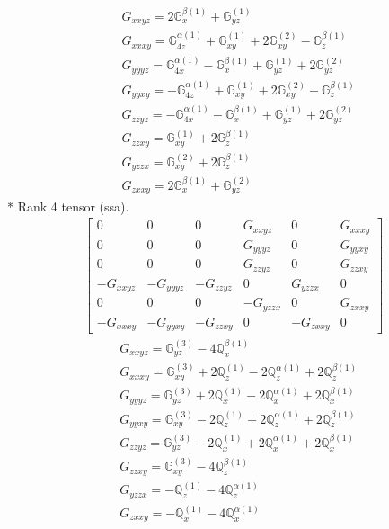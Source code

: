 \documentclass[fleqn,8pt,landscape]{jsarticle}
\begin{document}
\begin{align*}
& G_{xxyz} = 2 \mathbb{G}_{x}^{\beta(1)} + \mathbb{G}_{yz}^{(1)} \\
& G_{xxxy} = \mathbb{G}_{4z}^{\alpha(1)} + \mathbb{G}_{xy}^{(1)} + 2 \mathbb{G}_{xy}^{(2)} - \mathbb{G}_{z}^{\beta(1)} \\
& G_{yyyz} = \mathbb{G}_{4x}^{\alpha(1)} - \mathbb{G}_{x}^{\beta(1)} + \mathbb{G}_{yz}^{(1)} + 2 \mathbb{G}_{yz}^{(2)} \\
& G_{yyxy} = - \mathbb{G}_{4z}^{\alpha(1)} + \mathbb{G}_{xy}^{(1)} + 2 \mathbb{G}_{xy}^{(2)} - \mathbb{G}_{z}^{\beta(1)} \\
& G_{zzyz} = - \mathbb{G}_{4x}^{\alpha(1)} - \mathbb{G}_{x}^{\beta(1)} + \mathbb{G}_{yz}^{(1)} + 2 \mathbb{G}_{yz}^{(2)} \\
& G_{zzxy} = \mathbb{G}_{xy}^{(1)} + 2 \mathbb{G}_{z}^{\beta(1)} \\
& G_{yzzx} = \mathbb{G}_{xy}^{(2)} + 2 \mathbb{G}_{z}^{\beta(1)} \\
& G_{zxxy} = 2 \mathbb{G}_{x}^{\beta(1)} + \mathbb{G}_{yz}^{(2)}
\end{align*}
* Rank 4 tensor (ssa).
\begin{align*}
\begin{bmatrix} 0 & 0 & 0 & G_{xxyz} & 0 & G_{xxxy} \\ 0 & 0 & 0 & G_{yyyz} & 0 & G_{yyxy} \\ 0 & 0 & 0 & G_{zzyz} & 0 & G_{zzxy} \\ - G_{xxyz} & - G_{yyyz} & - G_{zzyz} & 0 & G_{yzzx} & 0 \\ 0 & 0 & 0 & - G_{yzzx} & 0 & G_{zxxy} \\ - G_{xxxy} & - G_{yyxy} & - G_{zzxy} & 0 & - G_{zxxy} & 0 \end{bmatrix}
\end{align*}
\begin{align*}
& G_{xxyz} = \mathbb{G}_{yz}^{(3)} - 4 \mathbb{Q}_{x}^{\beta(1)} \\
& G_{xxxy} = \mathbb{G}_{xy}^{(3)} + 2 \mathbb{Q}_{z}^{(1)} - 2 \mathbb{Q}_{z}^{\alpha(1)} + 2 \mathbb{Q}_{z}^{\beta(1)} \\
& G_{yyyz} = \mathbb{G}_{yz}^{(3)} + 2 \mathbb{Q}_{x}^{(1)} - 2 \mathbb{Q}_{x}^{\alpha(1)} + 2 \mathbb{Q}_{x}^{\beta(1)} \\
& G_{yyxy} = \mathbb{G}_{xy}^{(3)} - 2 \mathbb{Q}_{z}^{(1)} + 2 \mathbb{Q}_{z}^{\alpha(1)} + 2 \mathbb{Q}_{z}^{\beta(1)} \\
& G_{zzyz} = \mathbb{G}_{yz}^{(3)} - 2 \mathbb{Q}_{x}^{(1)} + 2 \mathbb{Q}_{x}^{\alpha(1)} + 2 \mathbb{Q}_{x}^{\beta(1)} \\
& G_{zzxy} = \mathbb{G}_{xy}^{(3)} - 4 \mathbb{Q}_{z}^{\beta(1)} \\
& G_{yzzx} = - \mathbb{Q}_{z}^{(1)} - 4 \mathbb{Q}_{z}^{\alpha(1)} \\
& G_{zxxy} = - \mathbb{Q}_{x}^{(1)} - 4 \mathbb{Q}_{x}^{\alpha(1)}
\end{align*}
\end{document}
